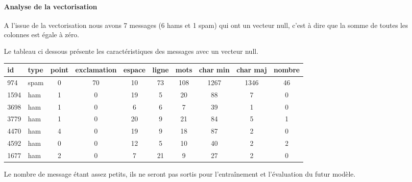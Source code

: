 \documentclass[a4paper,12pt]{article}
\begin{document}
		\paragraph{Analyse de la vectorisation}
			A l'issue de la vectorisation nous avons 7 messages (6 hams et 1 spam) qui ont un vecteur null, c'est à dire que la somme de toutes les colonnes est égale à zéro.
			
			Le tableau ci dessous présente les caractéristiques des messages avec un vecteur null.
			
			\begin{tabular}{|l|l|c|c|c|c|c|c|c|c|}
				\hline
				id & type & point & exclamation & espace & ligne & mots & char min & char maj & nombre \\
				\hline
				974 & spam & 0 & 70 & 10 & 73 & 108 & 1267 & 1346 & 46 \\
				\hline
				1594 & ham & 1 & 0 & 19 & 5 & 20 & 88 & 7 & 0 \\
				\hline
				3698 & ham & 1 & 0 & 6 & 6 & 7 & 39 & 1 & 0 \\
				\hline
				3779 & ham & 1 & 0 & 20 & 9 & 21 & 84 & 5 & 1 \\
				\hline
				4470 & ham & 4 & 0 & 19 & 9 & 18 & 87 & 2 & 0 \\
				\hline
				4592 & ham & 0 & 0 & 12 & 5 & 10 & 40 & 2 & 2 \\
				\hline
				1677 & ham & 2 & 0 & 7 & 21 & 9 & 27 & 2 & 0 \\
				\hline
			\end{tabular}
			
			Le nombre de message étant assez petits, ils ne seront pas sortis pour l’entraînement et l'évaluation du futur modèle. \\
			
\end{document}
